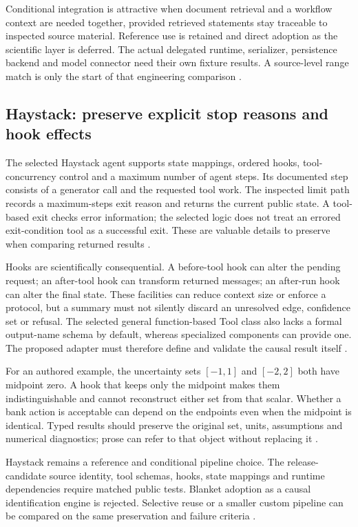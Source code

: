 Conditional integration is attractive when document retrieval and a
workflow context are needed together, provided retrieved statements stay
traceable to inspected source material. Reference use is retained and
direct adoption as the scientific layer is deferred. The actual delegated
runtime, serializer, persistence backend and model connector need their
own fixture results. A source-level range match is only the start of
that engineering comparison \cite{exec24_framework_contracts}.

\subsection{Haystack: preserve explicit stop reasons and hook effects}
The selected Haystack agent supports state mappings, ordered hooks,
tool-concurrency control and a maximum number of agent steps. Its
documented step consists of a generator call and the requested tool work.
The inspected limit path records a maximum-steps exit reason and returns
the current public state. A tool-based exit checks error information;
the selected logic does not treat an errored exit-condition tool as a
successful exit. These are valuable details to preserve when comparing
returned results
\cite{exec24_framework_haystack}.

Hooks are scientifically consequential. A before-tool hook can alter
the pending request; an after-tool hook can transform returned messages;
an after-run hook can alter the final state. These facilities can reduce
context size or enforce a protocol, but a summary must not silently
discard an unresolved edge, confidence set or refusal. The selected
general function-based Tool class also lacks a formal output-name schema
by default, whereas specialized components can provide one. The proposed
adapter must therefore define and validate the causal result itself
\cite{exec24_framework_haystack,exec24_framework_contracts}.

For an authored example, the uncertainty sets $[-1,1]$ and $[-2,2]$
both have midpoint zero. A hook that keeps only the midpoint makes them
indistinguishable and cannot reconstruct either set from that scalar.
Whether a bank action is acceptable can depend on the endpoints even
when the midpoint is identical. Typed results should preserve the
original set, units, assumptions and numerical diagnostics; prose can
refer to that object without replacing it
\cite{exec24_framework_contracts}.

Haystack remains a reference and conditional pipeline choice. The
release-candidate source identity, tool schemas, hooks, state mappings
and runtime dependencies require matched public tests. Blanket adoption
as a causal identification engine is rejected. Selective reuse or a
smaller custom pipeline can be compared on the same preservation and
failure criteria \cite{exec24_framework_contracts}.

